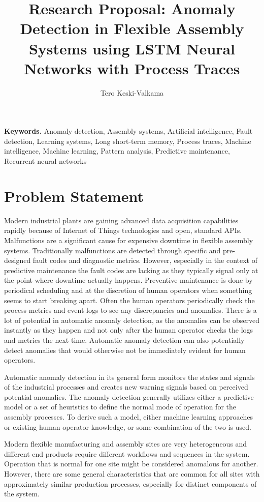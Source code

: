 \documentclass[a4paper,10pt]{article}
\title{Research Proposal: Anomaly Detection in Flexible Assembly Systems using LSTM Neural Networks with Process Traces}
\author{Tero Keski-Valkama}
\begin{document}
\maketitle

\smallskip
\noindent \textbf{Keywords.} Anomaly detection, Assembly systems, Artificial intelligence, Fault detection, Learning systems, Long short-term memory,
Process traces, Machine intelligence, Machine learning, Pattern analysis, Predictive maintenance, Recurrent neural networks

\section{Problem Statement}

Modern industrial plants are gaining advanced data acquisition capabilities rapidly because of Internet of Things technologies and open, standard APIs.
Malfunctions are a significant cause for expensive downtime in flexible assembly systems. Traditionally malfunctions are detected through specific and pre-designed fault codes
and diagnostic metrics. However, especially in the context of predictive maintenance the fault codes are lacking as they typically signal only at the point where downtime
actually happens. Preventive maintenance is done by periodical scheduling and at the discretion of human operators when something seems to start breaking apart.
Often the human operators periodically check the process metrics and event logs to see any discrepancies and anomalies. There is a lot of potential in automatic anomaly
detection, as the anomalies can be observed instantly as they happen and not only after the human operator checks the logs and metrics the next time. Automatic
anomaly detection can also potentially detect anomalies that would otherwise not be immediately evident for human operators.

Automatic anomaly detection in its general form monitors the states and signals of the industrial processes and creates new warning signals based on perceived potential anomalies.
The anomaly detection generally utilizes either a predictive model or a set of heuristics to define the normal mode of operation for the assembly processes. To derive such a model,
either machine learning approaches or existing human operator knowledge, or some combination of the two is used.

Modern flexible manufacturing and assembly sites are very heterogeneous and different end products require different workflows and sequences in the system. Operation that is normal
for one site might be considered anomalous for another. However, there are some general characteristics that are common for all sites with approximately similar
production processes, especially for distinct components of the system.
\end{document}
